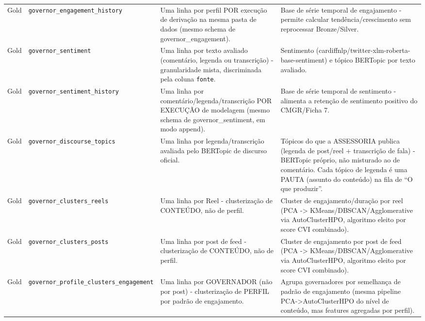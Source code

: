\begin{footnotesize}
\begin{longtable}{p{1.2cm}p{3.4cm}p{3.6cm}p{6.0cm}}
Gold & \texttt{governor\_\allowbreak{}engagement\_\allowbreak{}history} & Uma linha por perfil POR execução de derivação na mesma pasta de dados (mesmo schema de governor\_\allowbreak{}engagement). & Base de série temporal de engajamento - permite calcular tendência/\allowbreak{}crescimento sem reprocessar Bronze/\allowbreak{}Silver. \\
Gold & \texttt{governor\_\allowbreak{}sentiment} & Uma linha por texto avaliado (comentário, legenda ou transcrição) - granularidade mista, discriminada pela coluna \texttt{fonte}. & Sentimento (cardiffnlp/\allowbreak{}twitter-xlm-roberta-base-sentiment) e tópico BERTopic por texto avaliado. \\
Gold & \texttt{governor\_\allowbreak{}sentiment\_\allowbreak{}history} & Uma linha por comentário/\allowbreak{}legenda/\allowbreak{}transcrição POR EXECUÇÃO de modelagem (mesmo schema de governor\_\allowbreak{}sentiment, em modo append). & Base de série temporal de sentimento - alimenta a retenção de sentimento positivo do CMGR/\allowbreak{}Ficha 7. \\
Gold & \texttt{governor\_\allowbreak{}discourse\_\allowbreak{}topics} & Uma linha por legenda/\allowbreak{}transcrição avaliada pelo BERTopic de discurso oficial. & Tópicos do que a ASSESSORIA publica (legenda de post/\allowbreak{}reel + transcrição de fala) - BERTopic próprio, não misturado ao de comentário. Cada tópico de legenda é uma PAUTA (assunto do conteúdo) na fila de ``O que produzir''. \\
Gold & \texttt{governor\_\allowbreak{}clusters\_\allowbreak{}reels} & Uma linha por Reel - clusterização de CONTEÚDO, não de perfil. & Cluster de engajamento/\allowbreak{}duração por reel (PCA -> KMeans/\allowbreak{}DBSCAN/\allowbreak{}Agglomerative via AutoClusterHPO, algoritmo eleito por score CVI combinado). \\
Gold & \texttt{governor\_\allowbreak{}clusters\_\allowbreak{}posts} & Uma linha por post de feed - clusterização de CONTEÚDO, não de perfil. & Cluster de engajamento por post de feed (PCA -> KMeans/\allowbreak{}DBSCAN/\allowbreak{}Agglomerative via AutoClusterHPO, algoritmo eleito por score CVI combinado). \\
Gold & \texttt{governor\_\allowbreak{}profile\_\allowbreak{}clusters\_\allowbreak{}engagement} & Uma linha por GOVERNADOR (não por post) - clusterização de PERFIL por padrão de engajamento. & Agrupa governadores por semelhança de padrão de engajamento (mesma pipeline PCA->AutoClusterHPO do nível de conteúdo, mas features agregadas por perfil). \\

\end{longtable}
\end{footnotesize}
